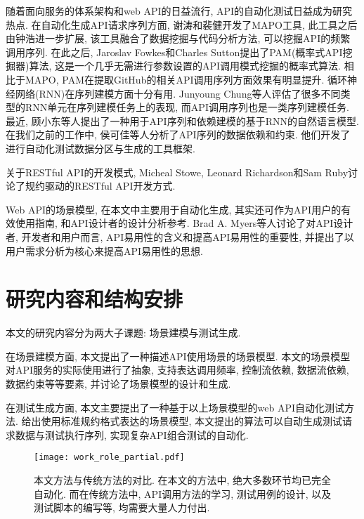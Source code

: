     	随着面向服务的体系架构和web API的日益流行, API的自动化测试日益成为研究热点. 在自动化生成API请求序列方面, 谢涛和裴健\cite{taox06}开发了MAPO工具, 此工具之后由钟浩进一步扩展\cite{Zhong2009}, 该工具融合了数据挖掘与代码分析方法, 可以挖掘API的频繁调用序列. 在此之后, Jaroslav Fowkes和Charles Sutton\cite{fowkes2016parameter}提出了PAM(概率式API挖掘器)算法, 这是一个几乎无需进行参数设置的API调用模式挖掘的概率式算法. 相比于MAPO, PAM在提取GitHub的相关API调用序列方面效果有明显提升. 循环神经网络(RNN)在序列建模方面十分有用. Junyoung Chung等人\cite{chung2014empirical}评估了很多不同类型的RNN单元在序列建模任务上的表现, 而API调用序列也是一类序列建模任务. 最近, 顾小东等人\cite{xiaodongg16}提出了一种用于API序列和依赖建模的基于RNN的自然语言模型. 在我们之前的工作中, 侯可佳等人\cite{kejiah13}分析了API序列的数据依赖和约束. 他们开发了进行自动化测试数据分区与生成的工具框架. 
    	
    	关于RESTful API的开发模式, Micheal Stowe\cite{michaels15}, Leonard Richardson和Sam Ruby\cite{leonardr07}讨论了规约驱动的RESTful API开发方式.
    	
    	Web API的场景模型, 在本文中主要用于自动化生成, 其实还可作为API用户的有效使用指南, 和API设计者的设计分析参考. Brad A. Myers等人\cite{bradm17}讨论了对API设计者, 开发者和用户而言, API易用性的含义和提高API易用性的重要性, 并提出了以用户需求分析为核心来提高API易用性的思想.

	\section{研究内容和结构安排}
	
	    本文的研究内容分为两大子课题: 场景建模与测试生成.
	
	    在场景建模方面, 本文提出了一种描述API使用场景的场景模型. 本文的场景模型对API服务的实际使用进行了抽象, 支持表达调用频率, 控制流依赖, 数据流依赖, 数据约束等等要素, 并讨论了场景模型的设计和生成.
	
        在测试生成方面, 本文主要提出了一种基于以上场景模型的web API自动化测试方法. 给出使用标准规约格式表达的场景模型, 本文提出的算法可以自动生成测试请求数据与测试执行序列, 实现复杂API组合测试的自动化.
        
        \begin{figure}[!htb]
            \centering
            \texttt{[image: work\_role\_partial.pdf]}
            \caption[本文方法与传统方法的对比]{本文方法与传统方法的对比. 在本文的方法中, 绝大多数环节均已完全自动化. 而在传统方法中, API调用方法的学习, 测试用例的设计, 以及测试脚本的编写等, 均需要大量人力付出.}
            \label{fig:overview}
        \end{figure}
        
